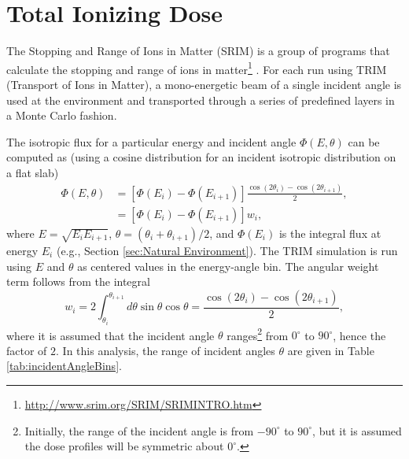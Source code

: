 \documentclass{hitec}
\begin{document}
\section{Total Ionizing Dose}

The Stopping and Range of Ions in Matter (SRIM) is a group of programs that calculate the stopping and range of ions in matter\footnote{\url{http://www.srim.org/SRIM/SRIMINTRO.htm}} \citep{ziegler2010srim}. %
For each run using TRIM (Transport of Ions in Matter), a mono-energetic beam of a single incident angle is used at the environment and transported through a series of predefined layers in a Monte Carlo fashion.

The isotropic flux for a particular energy and incident angle $\Phi(E,\theta)$ can be computed as (using a cosine distribution for an incident isotropic distribution on a flat slab)
\begin{align}
	\Phi(E,\theta) &= [\Phi(E_i) - \Phi(E_{i+1})] \frac{\cos(2\theta_i) - \cos(2\theta_{i+1})}{2},\nonumber\\
	&= [\Phi(E_i) - \Phi(E_{i+1})] w_i,
\end{align}
where $E = \sqrt{E_i E_{i+1}}$, $\theta = (\theta_i + \theta_{i+1})/2$, and $\Phi(E_i)$ is the integral flux at energy $E_i$ (e.g., Section \ref{sec:Natural Environment}). The TRIM simulation is run using $E$ and $\theta$ as centered values in the energy-angle bin. The angular weight term follows from the integral
\begin{equation}
	w_i = 2\int_{\theta_i}^{\theta_{i+1}}d\theta\sin\theta\cos\theta = \frac{\cos(2\theta_i) - \cos(2\theta_{i+1})}{2},
\end{equation}
where it is assumed that the incident angle $\theta$ ranges\footnote{Initially, the range of the incident angle is from $-90^\circ$ to $90^\circ$, but it is assumed the dose profiles will be symmetric about $0^\circ$.} from $0^\circ$ to $90^\circ$, hence the factor of $2$. In this analysis, the range of incident angles $\theta$ are given in Table \ref{tab:incidentAngleBins}.
\end{document}
